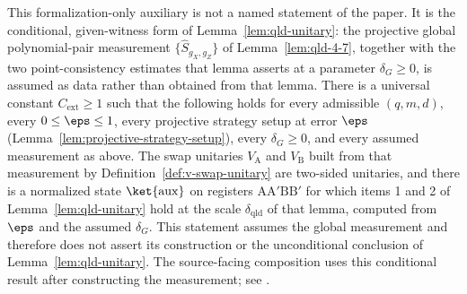 \begin{example}
	\label{lem:qld-unitary-given-global-pair}
	\leanok
	This formalization-only auxiliary is not a named statement of the paper. It is
	the conditional, given-witness form
	of Lemma~\ref{lem:qld-unitary}: the projective global polynomial-pair measurement
	$\{\hat{S}_{g_X,g_Z}\}$ of Lemma~\ref{lem:qld-4-7}, together with the two
	point-consistency estimates that lemma asserts at a parameter $\delta_G \geq 0$,
	is assumed as data rather than obtained from that lemma. There is a universal
	constant $C_{\mathrm{ext}} \geq 1$ such that the following holds for every
	admissible $(q,m,d)$, every $0 \leq \eps \leq 1$, every projective strategy
	setup at error $\eps$ (Lemma~\ref{lem:projective-strategy-setup}), every
	$\delta_G \geq 0$, and every assumed measurement as above. The swap unitaries
	$V_{\mathrm{A}}$ and $V_{\mathrm{B}}$ built from that measurement by
	Definition~\ref{def:v-swap-unitary} are two-sided unitaries, and there is a
	normalized state $\ket{\mathrm{aux}}$ on registers
	$\mathrm{A}\mathrm{A}'\mathrm{B}\mathrm{B}'$ for which items 1 and 2 of
	Lemma~\ref{lem:qld-unitary} hold at the scale $\delta_{\mathrm{qld}}$ of that
	lemma, computed from $\eps$ and the assumed $\delta_G$.
	This statement assumes the global measurement and therefore does not assert
	its construction or the unconditional conclusion of
	Lemma~\ref{lem:qld-unitary}. The source-facing composition uses this
	conditional result after constructing the measurement; see
	\cite{gap:qpbt_extraction-transfer}.
\end{example}
